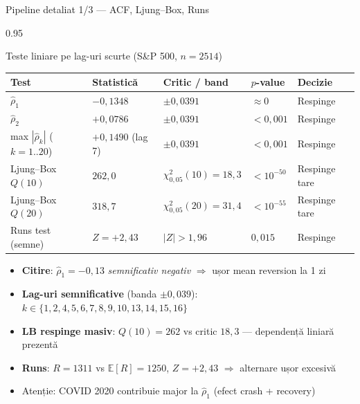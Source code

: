 \documentclass[9pt, aspectratio=169, t]{beamer}
\begin{document}
\begin{frame}[shrink=12]{Pipeline detaliat 1/3 --- ACF, Ljung--Box, Runs}
\begin{cminipage}{0.95\textwidth}
\begin{block}{Teste liniare pe lag-uri scurte (S\&P 500, $n=2514$)}
\renewcommand{\arraystretch}{1.05}
\footnotesize
\begin{tabular}{lllll}
\toprule
\textbf{Test} & \textbf{Statistică} & \textbf{Critic / band} & \textbf{$p$-value} & \textbf{Decizie} \\
\midrule
$\hat\rho_1$            & $-0{,}1348$        & $\pm 0{,}0391$       & $\approx 0$ & Respinge \\
$\hat\rho_2$            & $+0{,}0786$        & $\pm 0{,}0391$       & $< 0{,}001$ & Respinge \\
max $|\hat\rho_k|$ ($k=1..20$) & $+0{,}1490$ (lag 7) & $\pm 0{,}0391$ & $< 0{,}001$ & Respinge \\
Ljung--Box $Q(10)$      & $262{,}0$          & $\chi^2_{0{,}05}(10)=18{,}3$ & $< 10^{-50}$ & Respinge tare \\
Ljung--Box $Q(20)$      & $318{,}7$          & $\chi^2_{0{,}05}(20)=31{,}4$ & $< 10^{-55}$ & Respinge tare \\
Runs test (semne)       & $Z = +2{,}43$      & $|Z|>1{,}96$         & $0{,}015$   & Respinge \\
\bottomrule
\end{tabular}
\end{block}
\begin{itemize}\setlength{\itemsep}{0pt}
    \item \textbf{Citire}: $\hat\rho_1 = -0{,}13$ \emph{semnificativ negativ} $\Rightarrow$ ușor mean reversion la 1 zi
    \item \textbf{Lag-uri semnificative} (banda $\pm 0{,}039$): $k \in \{1,2,4,5,6,7,8,9,10,13,14,15,16\}$
    \item \textbf{LB respinge masiv}: $Q(10)=262$ vs critic $18{,}3$ --- dependență liniară prezentă
    \item \textbf{Runs}: $R = 1311$ vs $\mathbb{E}[R] = 1250$, $Z = +2{,}43$ $\Rightarrow$ alternare ușor excesivă
    \item \alert{Atenție}: COVID 2020 contribuie major la $\hat\rho_1$ (efect crash + recovery)
\end{itemize}
\end{cminipage}
\end{frame}
\end{document}
